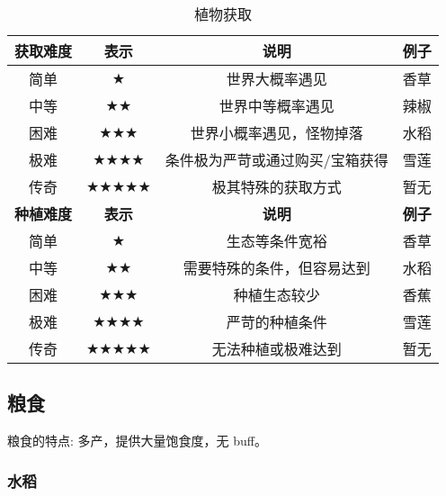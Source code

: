 \begin{table}[H]
    \centering
    \caption{植物获取}
    \label{table:植物获取}
    \setlength{\tabcolsep}{4mm}
    \begin{tabular}{c|ccc}
        \toprule
        \textbf{获取难度} & \textbf{表示} & \textbf{说明} & \textbf{例子} \\
        \midrule
        简单 & $\bigstar$ & 世界大概率遇见 & 香草 \\
        中等 & $\bigstar\bigstar$ & 世界中等概率遇见 & 辣椒 \\
        困难 & $\bigstar \bigstar \bigstar$ & 世界小概率遇见，怪物掉落 & 水稻 \\
        极难 & $\bigstar \bigstar \bigstar \bigstar$ & 条件极为严苛或通过购买/宝箱获得 & 雪莲 \\
        传奇 & $\bigstar \bigstar \bigstar \bigstar \bigstar$ & 极其特殊的获取方式 & 暂无 \\
        \midrule
        \textbf{种植难度} & \textbf{表示} & \textbf{说明} & \textbf{例子} \\
        \midrule
        简单 & $\bigstar$ & 生态等条件宽裕 & 香草 \\
        中等 & $\bigstar\bigstar$ & 需要特殊的条件，但容易达到 & 水稻 \\
        困难 & $\bigstar \bigstar \bigstar$ & 种植生态较少 & 香蕉 \\
        极难 & $\bigstar \bigstar \bigstar \bigstar$ & 严苛的种植条件 & 雪莲 \\
        传奇 & $\bigstar \bigstar \bigstar \bigstar \bigstar$ & 无法种植或极难达到 & 暂无 \\
        \bottomrule
    \end{tabular}
\end{table}

\subsection{粮食}

粮食的特点: 多产，提供大量饱食度，无 buff。

\subsubsection{水稻}

